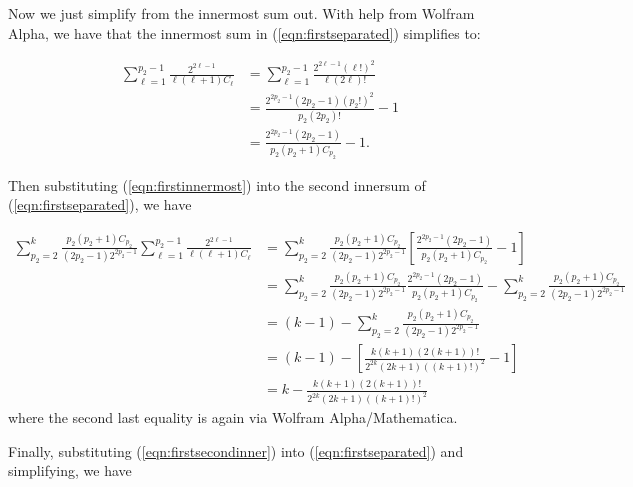 \documentclass[11pt]{article}
\theoremstyle{definition}
\theoremstyle{definition}
\theoremstyle{plain}
\theoremstyle{plain}
\theoremstyle{plain}
\theoremstyle{definition}
\theoremstyle{definition}
\begin{document}
{Now we just simplify from the innermost sum out. With help from Wolfram Alpha, we have that the innermost sum in (\ref{eqn:firstseparated}) simplifies to:

\begin{equation}\label{eqn:firstinnermost}
\begin{aligned}
\sum\limits_{\ell=1}^{p_2-1}\frac{2^{2\ell-1}}{\ell(\ell+1)C_\ell} &= \sum\limits_{\ell = 1}^{p_2-1} \frac{2^{2\ell-1}(\ell!)^2}{\ell(2\ell)!} \\
&= \frac{2^{2p_2-1}(2p_2-1)(p_2!)^2}{p_2(2p_2)!} - 1 \\
&= \frac{2^{2p_2-1}(2p_2-1)}{p_2(p_2+1)C_{p_2}} - 1.
\end{aligned}
\end{equation}

Then substituting (\ref{eqn:firstinnermost}) into the second innersum of (\ref{eqn:firstseparated}), we have

\begin{equation}\label{eqn:firstsecondinner}
\begin{aligned}
\sum\limits_{p_2=2}^k\frac{p_2(p_2+1)C_{p_2}}{(2p_2-1)2^{2p_2-1}}\sum\limits_{\ell=1}^{p_2-1}\frac{2^{2\ell-1}}{\ell(\ell+1)C_\ell} &= \sum\limits_{p_2=2}^k\frac{p_2(p_2+1)C_{p_2}}{(2p_2-1)2^{2p_2-1}}\left[\frac{2^{2p_2-1}(2p_2-1)}{p_2(p_2+1)C_{p_2}} - 1\right] \\
&= \sum\limits_{p_2=2}^k\frac{p_2(p_2+1)C_{p_2}}{(2p_2-1)2^{2p_2-1}}\frac{2^{2p_2-1}(2p_2-1)}{p_2(p_2+1)C_{p_2}} - \sum\limits_{p_2=2}^k\frac{p_2(p_2+1)C_{p_2}}{(2p_2-1)2^{2p_2-1}} \\
&= (k-1) - \sum\limits_{p_2=2}^k\frac{p_2(p_2+1)C_{p_2}}{(2p_2-1)2^{2p_2-1}} \\
&= (k-1) - \left[\frac{k(k+1)(2(k+1))!}{2^{2k}(2k+1)((k+1)!)^2}-1\right] \\
&= k - \frac{k(k+1)(2(k+1))!}{2^{2k}(2k+1)((k+1)!)^2}
\end{aligned}
\end{equation}
where the second last equality is again via Wolfram Alpha/Mathematica.

Finally, substituting (\ref{eqn:firstsecondinner}) into (\ref{eqn:firstseparated}) and simplifying, we have

}
\end{document}
